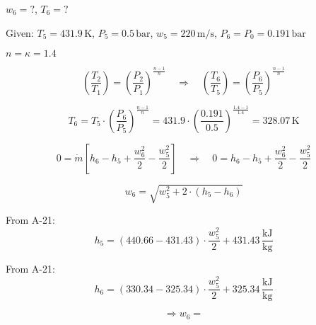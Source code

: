 \( w_6 = ? \), \( T_6 = ? \)  

Given:  
\( T_5 = 431.9 \, \text{K} \), \( P_5 = 0.5 \, \text{bar} \), \( w_5 = 220 \, \text{m/s} \), \( P_6 = P_0 = 0.191 \, \text{bar} \)  

\( n = \kappa = 1.4 \)  

\[
\left( \frac{T_2}{T_1} \right) = \left( \frac{P_2}{P_1} \right)^{\frac{n-1}{n}} \quad \Rightarrow \quad \left( \frac{T_6}{T_5} \right) = \left( \frac{P_6}{P_5} \right)^{\frac{n-1}{n}}
\]  

\[
T_6 = T_5 \cdot \left( \frac{P_6}{P_5} \right)^{\frac{n-1}{n}} = 431.9 \cdot \left( \frac{0.191}{0.5} \right)^{\frac{1.4-1}{1.4}} = 328.07 \, \text{K}
\]  

\[
0 = \dot{m} \left[ h_6 - h_5 + \frac{w_6^2}{2} - \frac{w_5^2}{2} \right] \quad \Rightarrow \quad 0 = h_6 - h_5 + \frac{w_6^2}{2} - \frac{w_5^2}{2}
\]  

\[
w_6 = \sqrt{w_5^2 + 2 \cdot (h_5 - h_6)}
\]  

From A-21:  
\[
h_5 = (440.66 - 431.43) \cdot \frac{w_5^2}{2} + 431.43 \, \frac{\text{kJ}}{\text{kg}}
\]  

From A-21:  
\[
h_6 = (330.34 - 325.34) \cdot \frac{w_5^2}{2} + 325.34 \, \frac{\text{kJ}}{\text{kg}}
\]  

\[
\Rightarrow w_6 =
\]